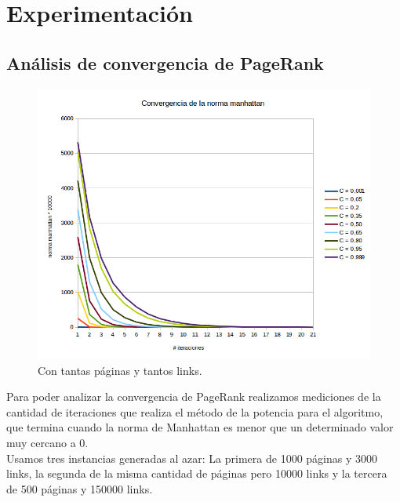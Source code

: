 \section{Experimentación}

\subsection{Análisis de convergencia de PageRank}
\begin{figure}
  \vspace{-20pt}
  \begin{center}
    \includegraphics[scale= 0.6]{imagenes/convergencia1.png}
  \end{center}
  \vspace{-20pt}
   \caption{Con tantas páginas y tantos links.}
  \vspace{-10pt}
  \label{fig:img1}
\end{figure}

Para poder analizar la convergencia de PageRank realizamos mediciones de la cantidad de iteraciones que realiza el método de la potencia para el algoritmo, que termina cuando la norma de Manhattan es menor que un determinado valor muy cercano a 0.\\

Usamos tres instancias generadas al azar: La primera de 1000 páginas y 3000 links, la segunda de la misma cantidad de páginas pero 10000 links y la tercera de 500 páginas y 150000 links.\\

